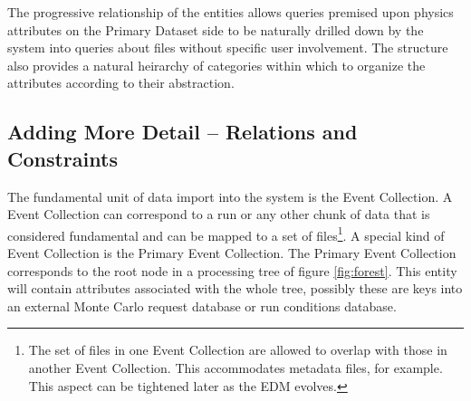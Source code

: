\documentclass{cmspaper}
\begin{document}
The progressive relationship of the entities allows queries 
premised upon physics attributes on the Primary Dataset side 
to be naturally drilled down by the system into queries about 
files without specific user involvement.
The structure also provides a natural heirarchy of categories within which to organize the 
attributes according to their abstraction.  

\subsection{Adding More Detail -- Relations and Constraints}


The fundamental unit of data import into the system is the Event Collection.  A Event Collection 
can correspond to a run or any other chunk of data that is considered fundamental and can be 
mapped to a set of files\footnote{The set of files in one Event Collection are allowed to overlap with 
those in another Event Collection.  This accommodates metadata files, for example.  This 
aspect can be tightened later as the EDM evolves.}.  
A special kind of Event Collection is the Primary Event Collection.  The Primary Event Collection
corresponds to the root node in a processing tree of figure \ref{fig:forest}.  This entity
will contain attributes associated with the whole tree, possibly these are keys into 
an external Monte Carlo request database or run conditions database.
\end{document}
